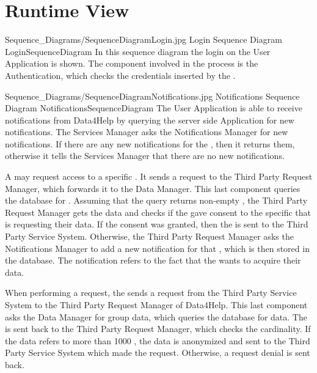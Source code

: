 \documentclass[../../DD.tex]{subfiles}
\begin{document}
\section{Runtime View\label{sect:2.4}}


	\image {13cm} {Sequence_Diagrams/SequenceDiagramLogin.jpg} {Login Sequence Diagram} {LoginSequenceDiagram}
	In this sequence diagram the  login on the User Application is shown. The component involved in the process is the Authentication, which checks the credentials inserted by the .

	\image {13cm} {Sequence_Diagrams/SequenceDiagramNotifications.jpg} {Notifications Sequence Diagram} {NotificationsSequenceDiagram}
	The User Application is able to receive notifications from Data4Help by querying the server side Application for new notifications. The Services Manager asks the Notifications Manager for new notifications. If there are any new notifications for the , then it returns them, otherwise it tells the Services Manager that there are no new notifications.

	A  may request access to a specific . It sends a request to the Third Party Request Manager, which forwards it to the Data Manager. This last component queries the database for . Assuming that the query returns non-empty , the Third Party Request Manager gets the data and checks if the  gave consent to the specific  that is requesting their data. If the consent was granted, then the  is sent to the Third Party Service System. Otherwise, the Third Party Request Manager asks the Notifications Manager to add a new notification for that , which is then stored in the database. The notification refers to the fact that the  wants to acquire their data.

	When performing a  request, the  sends a request from the Third Party Service System to the Third Party Request Manager of Data4Help. This last component asks the Data Manager for group data, which queries the database for data. The  is sent back to the Third Party Request Manager, which checks the cardinality. If the data refers to more than 1000 , the data is anonymized and sent to the Third Party Service System which made the request. Otherwise, a request denial is sent back.
	
\end{document}
